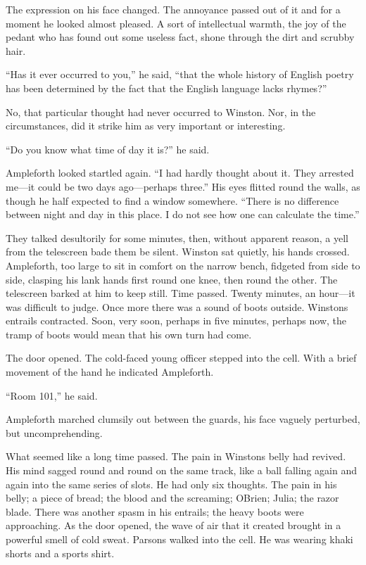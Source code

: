 The expression on his face changed. The annoyance passed out of it and
for a moment he looked almost pleased. A sort of intellectual warmth,
the joy of the pedant who has found out some useless fact, shone through
the dirt and scrubby hair.

``Has it ever occurred to you,'' he said, ``that the whole history of
English poetry has been determined by the fact that the English language
lacks rhymes?''

No, that particular thought had never occurred to Winston. Nor, in the
circumstances, did it strike him as very important or interesting.

``Do you know what time of day it is?'' he said.

Ampleforth looked startled again. ``I had hardly thought about it. They
arrested me---it could be two days ago---perhaps three.'' His eyes
flitted round the walls, as though he half expected to find a window
somewhere. ``There is no difference between night and day in this place.
I do not see how one can calculate the time.''

They talked desultorily for some minutes, then, without apparent reason,
a yell from the telescreen bade them be silent. Winston sat quietly, his
hands crossed. Ampleforth, too large to sit in comfort on the narrow
bench, fidgeted from side to side, clasping his lank hands first round
one knee, then round the other. The telescreen barked at him to keep
still. Time passed. Twenty minutes, an hour---it was difficult to judge.
Once more there was a sound of boots outside. Winston\textquotesingle s
entrails contracted. Soon, very soon, perhaps in five minutes, perhaps
now, the tramp of boots would mean that his own turn had come.

The door opened. The cold-faced young officer stepped into the cell.
With a brief movement of the hand he indicated Ampleforth.

``Room 101,'' he said.

Ampleforth marched clumsily out between the guards, his face vaguely
perturbed, but uncomprehending.

What seemed like a long time passed. The pain in
Winston\textquotesingle s belly had revived. His mind sagged round and
round on the same track, like a ball falling again and again into the
same series of slots. He had only six thoughts. The pain in his belly; a
piece of bread; the blood and the screaming; O\textquotesingle Brien;
Julia; the razor blade. There was another spasm in his entrails; the
heavy boots were approaching. As the door opened, the wave of air that
it created brought in a powerful smell of cold sweat. Parsons walked
into the cell. He was wearing khaki shorts and a sports shirt.

